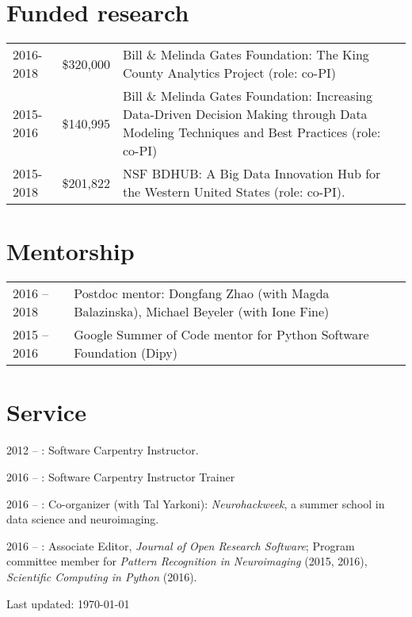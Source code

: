 \documentclass[11pt,fullpage]{article}
\begin{document}
\vspace{-2mm}
\section*{Funded research}
\vspace{-2mm}
\begin{tabular}{llp{12cm}}
  2016-2018 & \$320,000 & Bill \& Melinda Gates Foundation: The King County Analytics Project (role: co-PI) \\
  2015-2016 & \$140,995 & Bill \& Melinda Gates Foundation: Increasing Data-Driven Decision Making through Data Modeling Techniques and Best Practices (role: co-PI)\\
  2015-2018 & \$201,822 & NSF BDHUB: A Big Data Innovation Hub for the Western United States (role: co-PI).\\
\end{tabular}


\vspace{-2mm}
\section*{Mentorship}
\vspace{-2mm}
\begin{longtable}{p{1.0in}|p{5.5in}}

2016 -- 2018 & Postdoc mentor: Dongfang Zhao (with Magda Balazinska), Michael Beyeler (with Ione Fine) \\

2015 -- 2016 & Google Summer of Code mentor for Python Software Foundation (Dipy)\\

\end{longtable}

\vspace{-2mm}
\section*{Service}
\vspace{-2mm}
2012 -- : Software Carpentry Instructor.

2016 -- : Software Carpentry Instructor Trainer

2016 -- : Co-organizer (with Tal Yarkoni): \emph{Neurohackweek}, a summer school in data science and neuroimaging.

2016 -- : Associate Editor, \emph{Journal of Open Research Software}; Program committee member for \emph{Pattern Recognition in Neuroimaging} (2015, 2016), \emph{Scientific Computing in Python} (2016).

\bigskip
\begin{center}
  \begin{footnotesize}
    Last updated: \today
  \end{footnotesize}
\end{center}

\end{document}
